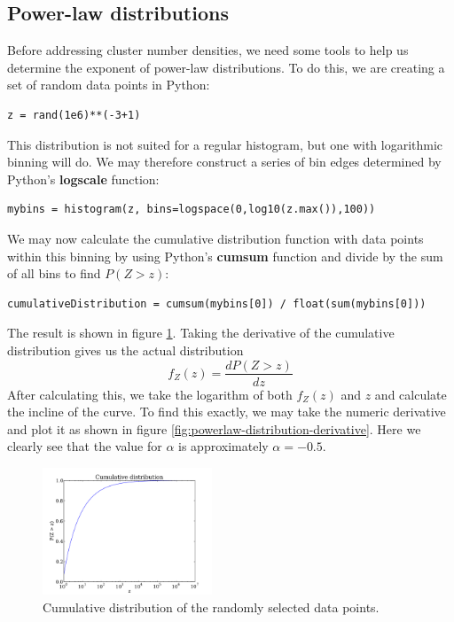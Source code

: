 \documentclass[a4paper,reprint,floatfix,amsmath,amssymb,aps,pra]{revtex4-1}
\begin{document}
\subsection{Power-law distributions}

Before addressing cluster number densities, we need some tools to help us determine the exponent of power-law distributions. To do this, we are creating a set of random data points in Python:
\begin{lstlisting}
z = rand(1e6)**(-3+1)
\end{lstlisting}
This distribution is not suited for a regular histogram, but one with logarithmic binning will do. We may therefore construct a series of bin edges determined by Python's \textbf{logscale} function:
\begin{lstlisting}
mybins = histogram(z, bins=logspace(0,log10(z.max()),100))
\end{lstlisting}
We may now calculate the cumulative distribution function with data points within this binning by using Python's \textbf{cumsum} function and divide by the sum of all bins to find $P(Z > z)$:
\begin{lstlisting}
cumulativeDistribution = cumsum(mybins[0]) / float(sum(mybins[0]))
\end{lstlisting}
The result is shown in figure \ref{fig:powerlaw-cumulative-distribution}. Taking the derivative of the cumulative distribution gives us the actual distribution
\begin{equation}
  f_{Z}(z) = \frac{dP(Z > z)}{dz}
\end{equation} 
After calculating this, we take the logarithm of both $f_{Z}(z)$ and $z$ and calculate the incline of the curve. To find this exactly, we may take the numeric derivative and plot it as shown in figure \ref{fig:powerlaw-distribution-derivative}. Here we clearly see that the value for $\alpha$ is approximately $\alpha = -0.5$.
\begin{figure}
  \centering
  \includegraphics[width=0.45\textwidth]{../percolation/results/1c/cumulative-distribution.pdf}
  \caption{Cumulative distribution of the randomly selected data points.}
  \label{fig:powerlaw-cumulative-distribution}
\end{figure}
\end{document}
